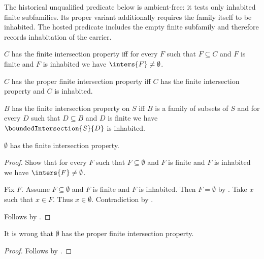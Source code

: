 The historical unqualified predicate below is ambient-free: it tests only
inhabited finite subfamilies.  Its proper variant additionally requires the
family itself to be inhabited.  The hosted predicate includes the empty
finite subfamily and therefore records inhabitation of the carrier.

\begin{definition}\label{finite_intersection_property}
    $C$ has the finite intersection property iff
        for every $F$ such that $F\subseteq C$ and $F$ is finite and
            $F$ is inhabited we have $\inters{F}\neq\emptyset$.
\end{definition}

\begin{definition}\label{proper_finite_intersection_property}
    $C$ has the proper finite intersection property iff
        $C$ has the finite intersection property and $C$ is inhabited.
\end{definition}

\begin{definition}\label{finite_intersection_property_on}
    $B$ has the finite intersection property on $S$ iff
        $B$ is a family of subsets of $S$ and
        for every $D$ such that $D\subseteq B$ and $D$ is finite we have
            $\boundedIntersection{S}{D}$ is inhabited.
\end{definition}

\begin{proposition}\label{empty_family_has_finite_intersection_property}
    $\emptyset$ has the finite intersection property.
\end{proposition}
\begin{proof}
    Show that for every $F$ such that $F\subseteq\emptyset$ and $F$ is finite
        and $F$ is inhabited we have $\inters{F}\neq\emptyset$.
    \begin{subproof}
        Fix $F$.
        Assume $F\subseteq\emptyset$ and $F$ is finite and $F$ is inhabited.
        Then $F=\emptyset$ by .
        Take $x$ such that $x\in F$.
        Thus $x\in\emptyset$.
        Contradiction by .
    \end{subproof}
    Follows by .
\end{proof}

\begin{proposition}\label{empty_family_has_no_proper_finite_intersection_property}
    It is wrong that $\emptyset$ has the proper finite intersection property.
\end{proposition}
\begin{proof}
    Follows by
        .
\end{proof}


